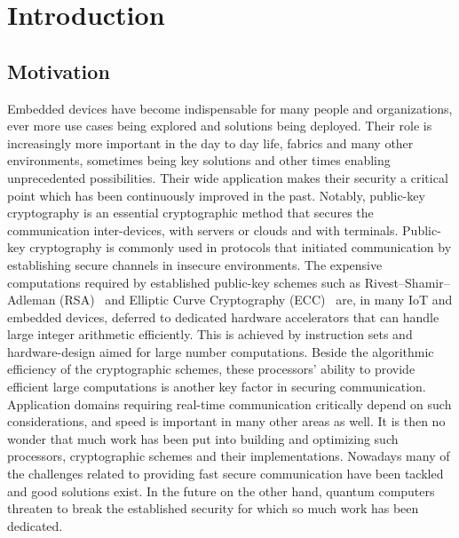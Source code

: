 
\chapter{Introduction}\label{chapter:introduction}

\section{Motivation}

Embedded devices have become indispensable for many people and organizations, ever more use cases being explored and solutions being deployed. Their role is increasingly more important in the day to day life, fabrics and many other environments, sometimes being key solutions and other times enabling unprecedented possibilities. Their wide application makes their security a critical point which has been continuously improved in the past. Notably, public-key cryptography is an essential cryptographic method that secures the communication inter-devices, with servers or clouds and with terminals. Public-key cryptography is commonly used in protocols that initiated communication by establishing secure channels in insecure environments. The expensive computations required by established public-key schemes such as Rivest–Shamir–Adleman (RSA)~\parencite{10.1145/359340.359342} and Elliptic Curve Cryptography (ECC)~\parencite{10.1007/3-540-39799-X_31} are, in many IoT and embedded devices, deferred to dedicated hardware accelerators that can handle large integer arithmetic efficiently. This is achieved by instruction sets and hardware-design aimed for large number computations. Beside the algorithmic efficiency of the cryptographic schemes, these processors' ability to provide efficient large computations is another key factor in securing communication. Application domains requiring real-time communication critically depend on such considerations, and speed is important in many other areas as well. It is then no wonder that much work has been put into building and optimizing such processors, cryptographic schemes and their implementations. Nowadays many of the challenges related to providing fast secure communication have been tackled and good solutions exist. In the future on the other hand, quantum computers threaten to break the established security for which so much work has been dedicated.

